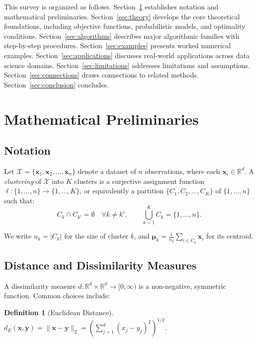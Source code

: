\documentclass[conference]{IEEEtran}
\newtheorem{definition}{Definition}
\begin{document}
This survey is organized as follows. Section~\ref{sec:prelim} establishes notation and mathematical preliminaries. Section~\ref{sec:theory} develops the core theoretical foundations, including objective functions, probabilistic models, and optimality conditions. Section~\ref{sec:algorithms} describes major algorithmic families with step-by-step procedures. Section~\ref{sec:examples} presents worked numerical examples. Section~\ref{sec:applications} discusses real-world applications across data science domains. Section~\ref{sec:limitations} addresses limitations and assumptions. Section~\ref{sec:connections} draws connections to related methods. Section~\ref{sec:conclusion} concludes.

\section{Mathematical Preliminaries}
\label{sec:prelim}

\subsection{Notation}

Let $\mathcal{X} = \{\mathbf{x}_1, \mathbf{x}_2, \ldots, \mathbf{x}_n\}$ denote a dataset of $n$ observations, where each $\mathbf{x}_i \in \mathbb{R}^d$. A \emph{clustering} of $\mathcal{X}$ into $K$ clusters is a surjective assignment function $\ell : \{1, \ldots, n\} \to \{1, \ldots, K\}$, or equivalently a partition $\{C_1, C_2, \ldots, C_K\}$ of $\{1, \ldots, n\}$ such that:
\[
C_k \cap C_{k'} = \emptyset \quad \forall k \neq k', \qquad \bigcup_{k=1}^{K} C_k = \{1, \ldots, n\}.
\]

We write $n_k = |C_k|$ for the size of cluster $k$, and $\boldsymbol{\mu}_k = \frac{1}{n_k}\sum_{i \in C_k} \mathbf{x}_i$ for its centroid.

\subsection{Distance and Dissimilarity Measures}

A dissimilarity measure $d : \mathbb{R}^d \times \mathbb{R}^d \to [0, \infty)$ is a non-negative, symmetric function. Common choices include:

\begin{definition}[Euclidean Distance]
$d_E(\mathbf{x}, \mathbf{y}) = \|\mathbf{x} - \mathbf{y}\|_2 = \left(\sum_{j=1}^d (x_j - y_j)^2\right)^{1/2}$.
\end{definition}
\end{document}
